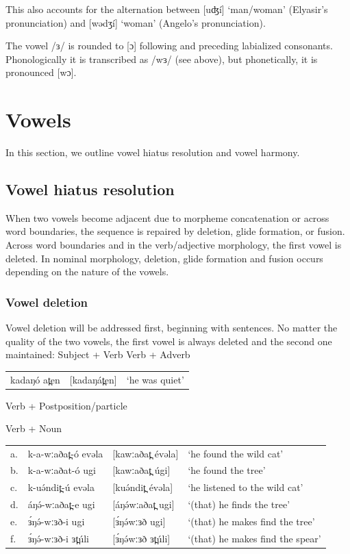 This also accounts for the alternation between [uʤí] ‘man/woman’ (Elyasir’s pronunciation) and [wədʒí] ‘woman’ (Angelo’s pronunciation).

The vowel /ɜ/ is rounded to [ɔ] following and preceding labialized consonants. Phonologically it is transcribed as /wɜ/ (see above), but phonetically, it is pronounced [wɔ]. 

\section{Vowels}
In this section, we outline vowel hiatus resolution and vowel harmony.

\subsection{Vowel hiatus resolution}\label{sec:ch5:hiatus}
When two vowels become adjacent due to morpheme concatenation or across word boundaries, the sequence is repaired by deletion, glide formation, or fusion. Across word boundaries and in the verb/adjective morphology, the first vowel is deleted. In nominal morphology, deletion, glide formation and fusion occurs depending on the nature of the vowels.

\subsubsection{Vowel deletion}
Vowel deletion will be addressed first, beginning with sentences. No matter the quality of the two vowels, the first vowel is always deleted and the second one maintained:
\ea Subject + Verb
\z
\ea Verb + Adverb
\begin{tabular}[t]{lll}
	kadaŋó at̪en	&	[kadaŋát̪en]	&	‘he was quiet’\\
\end{tabular}
\z

\ea Verb + Postposition/particle
\z

\ea Verb + Noun
\begin{tabular}[t]{llll}
a.	&	k-a-wːaðat̪-ó  evəla	&	[kawːaðat̪ évəla]	&	‘he found the wild cat’\\
b.	&	k-a-wːaðat-ó  ugi	&	[kawːaðat̪ úgi]	&	‘he found the tree’\\
c.	&	k-uə́ndit̪-ú evəla	&	[kuə́ndit̪ évəla]	&	‘he listened to the wild cat’\\
d.	&	áŋə́-wːaðat̪-e ugi	&	[áŋə́wːaðat̪ ugi]	&	‘(that) he finds the tree’\\
e.	&	ɜ́ŋə́-wːɜð-i ugi	&	[ɜ́ŋə́wːɜð ugi]	&	‘(that) he makes find the tree’\\
f.	&	ɜ́ŋə́-wːɜð-i ɜt̪úli	&	[ɜ́ŋə́wːɜð ɜt̪úli]	&	‘(that) he makes find the spear’\\
\end{tabular}
\z

